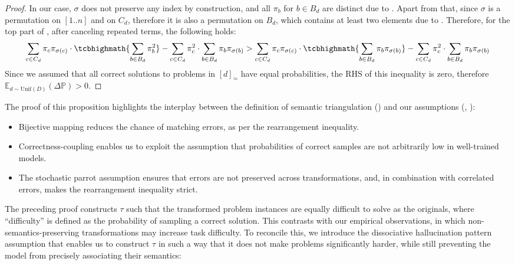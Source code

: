 \documentclass[acmsmall,screen,nonacm]{acmart}
\newcommand\hl[1]{\tcbhighmath{#1}}
\begin{document}
\begin{proof}
In our case, $\sigma$ does not preserve any index by construction, and all $\pi_b$ for $b\in B_d$ are distinct due to . Apart from that, since $\sigma$ is a permutation on $[1..n]$ and on $C_d$, therefore it is also a permutation on $B_d$, which contains at least two elements due to . Therefore, for the top part of , after canceling repeated terms, the following holds:
\begin{equation*}
\sum\limits_{c\in C_d} \pi_c \pi_{\sigma(c)}\cdot \hl{\sum\limits_{b \in B_d}\pi_b^2} - \sum\limits_{c\in C_d} \pi_c^2 \cdot \sum\limits_{b \in B_d}\pi_b \pi_{\sigma(b)} > \sum\limits_{c\in C_d} \pi_c \pi_{\sigma(c)}\cdot\hl{\sum\limits_{b \in B_d}\pi_b \pi_{\sigma(b)}} - \sum\limits_{c\in C_d}\pi_c^2\cdot\sum\limits_{b\in B_d}\pi_b \pi_{\sigma(b)}
\end{equation*}
Since we assumed that all correct solutions to problems in $[d]_\simeq$ have equal probabilities, the RHS of this inequality is zero, therefore $\mathds{E}_{d\sim\mathrm{Unif}(D)}(\Delta \mathds{P}) > 0$.
\end{proof}

The proof of this proposition highlights the interplay between the definition of semantic triangulation () and our assumptions (, ):
\begin{itemize}
\item Bijective mapping reduces the chance of matching errors, as per the rearrangement inequality.
\item Correctness-coupling enables us to exploit the assumption that probabilities of correct samples are not arbitrarily low in well-trained models.
\item The stochastic parrot assumption ensures that errors are not preserved across transformations, and, in combination with correlated errors, makes the rearrangement inequality strict.
\end{itemize}

The preceding proof constructs $\tau$ such that the transformed problem instances are equally difficult to solve as the originals, where ``difficulty'' is defined as the probability of sampling a correct solution. This contrasts with our empirical observations, in which non-semantics-preserving transformations may increase task difficulty. To reconcile this, we introduce the dissociative hallucination pattern assumption that enables us to construct $\tau$ in such a way that it does not make problems significantly harder, while still preventing the model from precisely associating their semantics:
\end{document}
